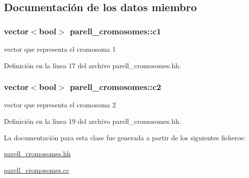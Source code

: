 \subsection{Documentación de los datos miembro}
\subsubsection[{\texorpdfstring{c1}{c1}}]{\setlength{\rightskip}{0pt plus 5cm}vector$<$bool$>$ parell\+\_\+cromosomes\+::c1\hspace{0.3cm}{\ttfamily [private]}}\hypertarget{classparell__cromosomes_ab4d7cfc40f53a1698b4ea3ef1f2cd199}{}\label{classparell__cromosomes_ab4d7cfc40f53a1698b4ea3ef1f2cd199}


vector que representa el cromosoma 1 



Definición en la línea 17 del archivo parell\+\_\+cromosomes.\+hh.

\subsubsection[{\texorpdfstring{c2}{c2}}]{\setlength{\rightskip}{0pt plus 5cm}vector$<$bool$>$ parell\+\_\+cromosomes\+::c2\hspace{0.3cm}{\ttfamily [private]}}\hypertarget{classparell__cromosomes_a888f09ecbc3329b0ee505fb0cb8bf98f}{}\label{classparell__cromosomes_a888f09ecbc3329b0ee505fb0cb8bf98f}


vector que representa el cromosoma 2 



Definición en la línea 19 del archivo parell\+\_\+cromosomes.\+hh.



La documentación para esta clase fue generada a partir de los siguientes ficheros\+:\begin{DoxyCompactItemize}
\item 
\hyperlink{parell__cromosomes_8hh}{parell\+\_\+cromosomes.\+hh}\item 
\hyperlink{parell__cromosomes_8cc}{parell\+\_\+cromosomes.\+cc}\end{DoxyCompactItemize}
